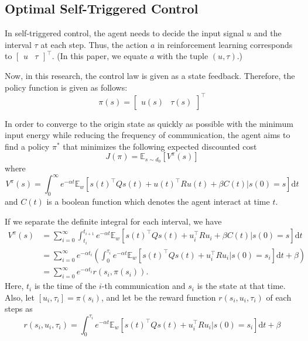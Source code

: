 \documentclass[english, dvipdfmx]{ampmt}             %
\newcommand{\expect}{\mathbb{E}}
\begin{document}
\subsection{Optimal Self-Triggered Control}
\label{sec:formulation}
In self-triggered control, the agent needs to decide the input signal $u$ and the interval $\tau$ at each step. Thus, the action $a$ in reinforcement learning corresponds to $\begin{bmatrix}u & \tau \end{bmatrix}^{\top}$. (In this paper, we equate $a$ with the tuple $(u,\tau)$.) \par
Now, in this research, the control law is given as a state feedback. Therefore, the policy function is given as follows:
\begin{equation}
	\pi(s) = \begin{bmatrix}u(s) & \tau(s)\end{bmatrix}^{\top}
\end{equation}\par
In order to converge to the origin state as quickly as possible with the minimum input energy while reducing the frequency of communication, the agent aims to find a policy $\pi^{*}$ that minimizes the following expected discounted cost 
\begin{equation}
	J(\pi)=\expect_{s\sim d_0}[V^{\pi}(s)] \label{evaluation}
\end{equation}
where
\begin{equation}
	V^{\pi}(s) = \int_{0}^{\infty} e^{-\alpha t}\expect_{w}[s(t)^{\top}Qs(t)+u(t)^{\top}Ru(t)+\beta C(t)|s(0)=s]\textrm{d}t \label{such_that}
\end{equation}
and $C(t)$ is a boolean function which denotes the agent interact at time $t$.\par
If we separate the definite integral for each interval, we have 
\begin{align}
	V^{\pi}(s) &= \sum_{i=0}^{\infty}\int_{t_i}^{t_{i+1}} e^{-\alpha t}\expect_{w}[s(t)^{\top}Qs(t)+u_i^{\top}Ru_i+\beta C(t)|s(0)=s]\textrm{d}t \nonumber \\
			 &= \sum_{i=0}^{\infty} e^{-\alpha t_i} \left(\int_{0}^{\tau_i}e^{-\alpha t}\expect_{w}[s(t)^{\top}Qs(t)+u_i^{\top}Ru_i|s(0)=s_i]\textrm{d}t + \beta\right) \nonumber \\
			 &= \sum_{i=0}^{\infty} e^{-\alpha t_i} r(s_i, \pi(s_i)) \label{self_acc_reward}.
\end{align}
Here, $t_i$ is the time of the $i$-th communication and $s_i$ is the state at that time. Also, let $[u_i, \tau_i]=\pi(s_i)$, and let be the reward function $r(s_i, u_i, \tau_i)$ of each steps as
\begin{equation}
	r(s_i, u_i, \tau_i) = \int_{0}^{\tau_i}e^{-\alpha t}\expect_{w}[s(t)^{\top}Qs(t)+u_i^{\top}Ru_i|s(0)=s_i]\textrm{d}t + \beta
\end{equation}
\end{document}

